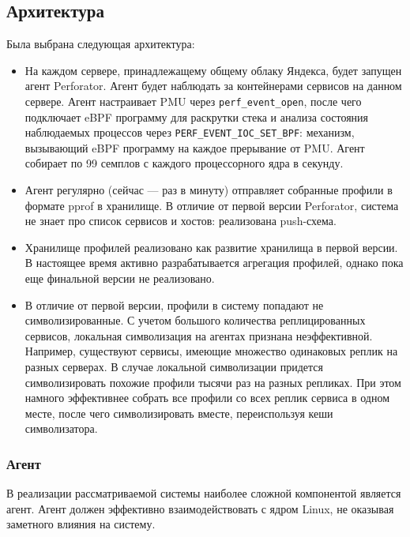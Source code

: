 \subsection{Архитектура}
Была выбрана следующая архитектура:
\begin{itemize}
    \item
        На каждом сервере, принадлежащему общему облаку Яндекса, будет запущен агент Perforator.
        Агент будет наблюдать за контейнерами сервисов на данном сервере.
        Агент настраивает PMU через \verb!perf_event_open!, после чего подключает eBPF программу для раскрутки стека и анализа
        состояния наблюдаемых процессов через \verb!PERF_EVENT_IOC_SET_BPF!: механизм, вызывающий eBPF программу на каждое прерывание от PMU.
        Агент собирает по 99 семплов с каждого процессорного ядра в секунду.

    \item
        Агент регулярно (сейчас --- раз в минуту) отправляет собранные профили в формате pprof в хранилище.
        В отличие от первой версии Perforator, система не знает про список сервисов и хостов: реализована push-схема.

    \item
        Хранилище профилей реализовано как развитие хранилища в первой версии.
        В настоящее время активно разрабатывается агрегация профилей, однако пока еще финальной версии не реализовано.

    \item
        В отличие от первой версии, профили в систему попадают не символизированные.
        С учетом большого количества реплицированных сервисов, локальная символизация на агентах признана неэффективной.
        Например, существуют сервисы, имеющие множество одинаковых реплик на разных серверах.
        В случае локальной символизации придется символизировать похожие профили тысячи раз на разных репликах.
        При этом намного эффективнее собрать все профили со всех реплик сервиса в одном месте, после чего символизировать вместе,
        переиспользуя кеши символизатора.
\end{itemize}

\subsubsection{Агент}
В реализации рассматриваемой системы наиболее сложной компонентой является агент.
Агент должен эффективно взаимодействовать с ядром Linux, не оказывая заметного влияния на систему.

